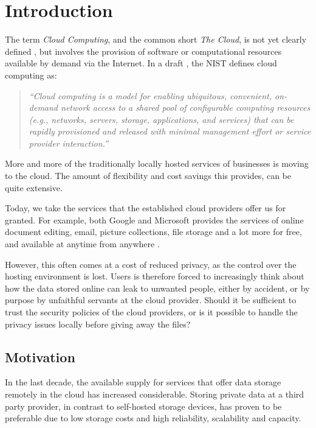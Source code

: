 \documentclass[pdftex,english,10pt,b5paper,twoside]{book}
\begin{document}
\chapter{Introduction}
\label{ch:intro}
\setcounter{page}{1}


The term \emph{Cloud Computing}, and the common short \emph{The Cloud},
is not yet clearly defined \cite{clouddef}, but involves the provision of
software or computational resources available by demand via the Internet.
In a draft \cite{cloud_nistdef}, the \ac{NIST} defines cloud computing as:
\begin{quote}\it
``Cloud computing is a model for enabling ubiquitous, convenient,
on-demand network access to a shared pool of configurable computing resources
(e.g., networks, servers, storage, applications, and services) that can be
rapidly provisioned and released with minimal management effort or service
provider interaction.''
\end{quote}

More and more of the traditionally locally hosted services of businesses is
moving to the cloud. The amount of flexibility and cost savings this
provides, can be quite extensive.

Today, we take the services that the established cloud providers offer us for
granted. For example, both Google and Microsoft provides the services of online
document editing, email, picture collections, file storage and a lot more for
free, and available at anytime from anywhere \cite{googleservices,
microsoftservices}.

However, this often comes at a cost of reduced privacy, as the control over the
hosting environment is lost. Users is therefore forced to increasingly think
about how the data stored online can leak to unwanted people, either by
accident, or by purpose by unfaithful servants at the cloud provider. Should it
be sufficient to trust the security policies of the cloud providers, or is it
possible to handle the privacy issues locally before giving away the files?

\section{Motivation}

In the last decade, the available supply for services that offer data storage
remotely in the cloud has increased considerable. Storing private data at a
third party provider, in contrast to self-hosted storage devices, has proven to
be preferable due to low storage costs and high reliability, scalability and
capacity.
\end{document}
